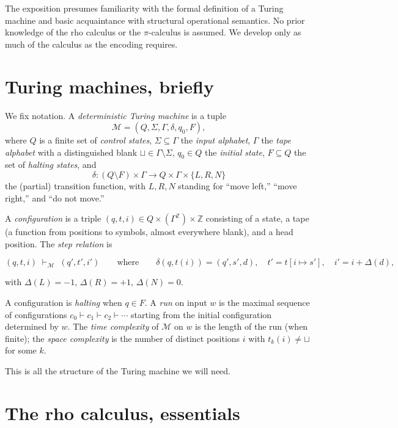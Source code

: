 \documentclass[11pt]{article}
\theoremstyle{plain}
\theoremstyle{definition}
\theoremstyle{remark}
\newcommand{\TM}{\mathcal{M}}
\newcommand{\Symb}{\Sigma}
\newcommand{\Tap}{\Gamma}
\newcommand{\Blank}{\sqcup}
\begin{document}
The exposition presumes familiarity with the formal definition of a Turing
machine and basic acquaintance with structural operational semantics. No
prior knowledge of the rho calculus or the $\pi$-calculus is assumed. We
develop only as much of the calculus as the encoding requires.

\section{Turing machines, briefly}\label{sec:tm}

We fix notation. A \emph{deterministic Turing machine} is a tuple
$$\TM = (Q, \Symb, \Tap, \delta, q_0, F),$$
where $Q$ is a finite set of \emph{control states}, $\Symb \subseteq \Tap$
the \emph{input alphabet}, $\Tap$ the \emph{tape alphabet} with a
distinguished blank $\Blank \in \Tap \setminus \Symb$, $q_0 \in Q$ the
\emph{initial state}, $F \subseteq Q$ the set of \emph{halting states}, and
$$ \delta : (Q \setminus F) \times \Tap \to Q \times \Tap \times \{L,R,N\} $$
the (partial) transition function, with $L,R,N$ standing for ``move
left,'' ``move right,'' and ``do not move.''

A \emph{configuration} is a triple $(q, t, i) \in Q \times (\Tap^\mathbb{Z}) \times \mathbb{Z}$
consisting of a state, a tape (a function from positions to symbols, almost
everywhere blank), and a head position. The \emph{step relation} is

$$
(q, t, i) \;\vdash_\TM\; (q', t', i')
\qquad
\text{where} \qquad
\delta(q, t(i)) = (q', s', d),
\quad
t' = t[i \mapsto s'],
\quad
i' = i + \Delta(d),
$$

with $\Delta(L)=-1$, $\Delta(R)=+1$, $\Delta(N)=0$.

A configuration is \emph{halting} when $q \in F$. A \emph{run} on input
$w$ is the maximal sequence of configurations
$c_0 \vdash c_1 \vdash c_2 \vdash \cdots$ starting from the initial
configuration determined by $w$. The \emph{time complexity} of $\TM$ on $w$
is the length of the run (when finite); the \emph{space complexity} is the
number of distinct positions $i$ with $t_k(i) \neq \Blank$ for some $k$.

This is all the structure of the Turing machine we will need.

\section{The rho calculus, essentials}\label{sec:rho}
\end{document}
